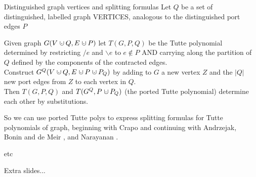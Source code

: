 \documentclass{beamer}
\newcommand{\dunion}
{\mbox{\hbox{\hskip0.45em$\cdot$\hskip-0.44em$\cup$\hskip0.2em}}}
\begin{document}
\begin{frame}{Distinguished graph vertices and splitting formulas}
Let $Q$ be a set of distinguished, labelled graph VERTICES, analogous to the
distinguished port edges $P$

\begin{theorem}
Given graph $G(V\dunion Q, E\dunion P)$ let $T(G,P,Q)$ be the Tutte polynomial 
determined by restricting $/e$ and $\backslash e$ to $e\not\in P$ AND 
carrying along the partition of $Q$ defined by the components of the contracted edges.\\
Construct $G^{Q}(V\dunion Q, E\dunion P\dunion P_Q)$ by 
adding to $G$ a new vertex $Z$ and the $|Q|$ new port edges
from $Z$ to each vertex in $Q$.\\
Then $T(G,P,Q)$ and $T(G^{Q},P\dunion P_Q)$ (the ported Tutte polynomial) 
determine each other by substitutions.
\end{theorem}

So we can use ported Tutte polys to express 
splitting formulas for Tutte polynomials of graph, beginning with Crapo 
\cite{CrapoChromJoining} 
and continuing with Andrzejak\cite{andrzejak97splitting},
Bonin and de Meir \cite{BonindeMierTutteGenParConn}, 
and Narayanan \cite{NarayananDecompVS1986,NaraGenMinorENet}.
\end{frame}

\begin{frame}{etc}
\begin{center}
Extra slides...
\end{center}
\end{frame}
\end{document}
